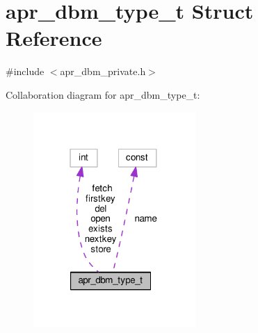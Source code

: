 \hypertarget{structapr__dbm__type__t}{}\section{apr\+\_\+dbm\+\_\+type\+\_\+t Struct Reference}
\label{structapr__dbm__type__t}


{\ttfamily \#include $<$apr\+\_\+dbm\+\_\+private.\+h$>$}



Collaboration diagram for apr\+\_\+dbm\+\_\+type\+\_\+t\+:
\nopagebreak
\begin{figure}[H]
\begin{center}
\leavevmode
\includegraphics[width=175pt]{structapr__dbm__type__t__coll__graph}
\end{center}
\end{figure}

